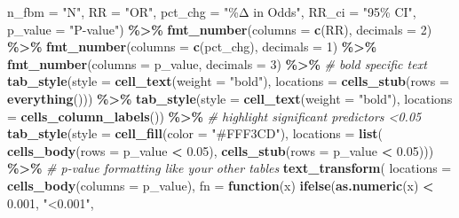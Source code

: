 \documentclass[
]{article}
\newenvironment{Shaded}{\begin{snugshade}}{\end{snugshade}}
\newcommand{\AttributeTok}[1]{\textcolor[rgb]{0.13,0.29,0.53}{#1}}
\newcommand{\CommentTok}[1]{\textcolor[rgb]{0.56,0.35,0.01}{\textit{#1}}}
\newcommand{\ControlFlowTok}[1]{\textcolor[rgb]{0.13,0.29,0.53}{\textbf{#1}}}
\newcommand{\DecValTok}[1]{\textcolor[rgb]{0.00,0.00,0.81}{#1}}
\newcommand{\FloatTok}[1]{\textcolor[rgb]{0.00,0.00,0.81}{#1}}
\newcommand{\FunctionTok}[1]{\textcolor[rgb]{0.13,0.29,0.53}{\textbf{#1}}}
\newcommand{\NormalTok}[1]{#1}
\newcommand{\SpecialCharTok}[1]{\textcolor[rgb]{0.81,0.36,0.00}{\textbf{#1}}}
\newcommand{\StringTok}[1]{\textcolor[rgb]{0.31,0.60,0.02}{#1}}
\begin{document}
\begin{Shaded}
\begin{Highlighting}[]
    \AttributeTok{n\_fbm =} \StringTok{"N"}\NormalTok{, }
    \AttributeTok{RR =} \StringTok{"OR"}\NormalTok{,}
    \AttributeTok{pct\_chg =} \StringTok{"\%Δ in Odds"}\NormalTok{,}
    \AttributeTok{RR\_ci =} \StringTok{"95\% CI"}\NormalTok{,}
    \AttributeTok{p\_value  =} \StringTok{"P{-}value"}\NormalTok{) }\SpecialCharTok{\%\textgreater{}\%}
  \FunctionTok{fmt\_number}\NormalTok{(}\AttributeTok{columns =} \FunctionTok{c}\NormalTok{(RR), }\AttributeTok{decimals =} \DecValTok{2}\NormalTok{) }\SpecialCharTok{\%\textgreater{}\%}
   \FunctionTok{fmt\_number}\NormalTok{(}\AttributeTok{columns =} \FunctionTok{c}\NormalTok{(pct\_chg), }\AttributeTok{decimals =} \DecValTok{1}\NormalTok{) }\SpecialCharTok{\%\textgreater{}\%}
  \FunctionTok{fmt\_number}\NormalTok{(}\AttributeTok{columns =}\NormalTok{ p\_value, }\AttributeTok{decimals =} \DecValTok{3}\NormalTok{) }\SpecialCharTok{\%\textgreater{}\%}
    \CommentTok{\# bold specific text}
  \FunctionTok{tab\_style}\NormalTok{(}\AttributeTok{style =} \FunctionTok{cell\_text}\NormalTok{(}\AttributeTok{weight =} \StringTok{"bold"}\NormalTok{),}
    \AttributeTok{locations =} \FunctionTok{cells\_stub}\NormalTok{(}\AttributeTok{rows =} \FunctionTok{everything}\NormalTok{())) }\SpecialCharTok{\%\textgreater{}\%}
  \FunctionTok{tab\_style}\NormalTok{(}\AttributeTok{style =} \FunctionTok{cell\_text}\NormalTok{(}\AttributeTok{weight =} \StringTok{"bold"}\NormalTok{),}
    \AttributeTok{locations =} \FunctionTok{cells\_column\_labels}\NormalTok{()) }\SpecialCharTok{\%\textgreater{}\%}
  \CommentTok{\# highlight significant predictors \textless{}0.05}
  \FunctionTok{tab\_style}\NormalTok{(}\AttributeTok{style =} \FunctionTok{cell\_fill}\NormalTok{(}\AttributeTok{color =} \StringTok{"\#FFF3CD"}\NormalTok{),}
            \AttributeTok{locations =} \FunctionTok{list}\NormalTok{(}
              \FunctionTok{cells\_body}\NormalTok{(}\AttributeTok{rows =}\NormalTok{ p\_value }\SpecialCharTok{\textless{}} \FloatTok{0.05}\NormalTok{),}
              \FunctionTok{cells\_stub}\NormalTok{(}\AttributeTok{rows =}\NormalTok{ p\_value }\SpecialCharTok{\textless{}} \FloatTok{0.05}\NormalTok{))) }\SpecialCharTok{\%\textgreater{}\%} 
  \CommentTok{\# p{-}value formatting like your other tables}
  \FunctionTok{text\_transform}\NormalTok{(}
    \AttributeTok{locations =} \FunctionTok{cells\_body}\NormalTok{(}\AttributeTok{columns =}\NormalTok{ p\_value),}
    \AttributeTok{fn =} \ControlFlowTok{function}\NormalTok{(x) }\FunctionTok{ifelse}\NormalTok{(}\FunctionTok{as.numeric}\NormalTok{(x) }\SpecialCharTok{\textless{}} \FloatTok{0.001}\NormalTok{, }\StringTok{"\textless{}0.001"}\NormalTok{,}

\end{Highlighting}
\end{Shaded}
\end{document}
